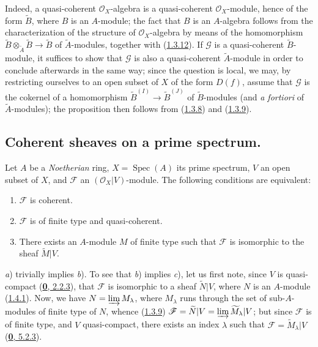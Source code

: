 Indeed, a quasi-coherent $\mathscr{O}_X$-algebra is a quasi-coherent
$\mathscr{O}_X$-module, hence of the form $\widetilde{B}$, where
$B$ is an $A$-module; the fact that $B$ is an $A$-algebra follows from the
characterization of the structure of $\mathscr{O}_X$-algebra by means of
the homomorphism
$\widetilde{B}\otimes_{\widetilde{A}}\widetilde{B}\to\widetilde{B}$ of
$\widetilde{A}$-modules, together with
(\hyperref[I.1.3.12]{1.3.12}). If $\mathscr{G}$ is a quasi-coherent
$\widetilde{B}$-module, it suffices to show that $\mathscr{G}$ is also a
quasi-coherent $\widetilde{A}$-module in order to conclude afterwards in the
same way; since the question is local, we may, by restricting ourselves to
an open subset of $X$ of the form $D(f)$, assume that $\mathscr{G}$ is the
cokernel of a homomorphism
$\widetilde{B}^{(I)}\to\widetilde{B}^{(J)}$ of $\widetilde{B}$-modules (and
\emph{a fortiori} of $\widetilde{A}$-modules); the proposition then follows
from (\hyperref[I.1.3.8]{1.3.8}) and
(\hyperref[I.1.3.9]{1.3.9}).

\subsection{Coherent sheaves on a prime spectrum.}
\label{subsection:I.1.5}

\begin{theorem}[1.5.1]
\label{I.1.5.1}
Let $A$ be a \emph{Noetherian} ring, $X=\operatorname{Spec}(A)$ its prime
spectrum, $V$ an open subset of $X$, and $\mathscr{F}$ an
$(\mathscr{O}_X|V)$-module. The following conditions are equivalent:
\begin{enumerate}
  \item[\textup{a)}] $\mathscr{F}$ is coherent.
  \item[\textup{b)}] $\mathscr{F}$ is of finite type and quasi-coherent.
  \item[\textup{c)}] There exists an $A$-module $M$ of finite type such that
  $\mathscr{F}$ is isomorphic to the sheaf $\widetilde{M}|V$.
\end{enumerate}
\end{theorem}

\textit{a}) trivially implies \textit{b}). To see that \textit{b})
implies \textit{c}), let us first note, since $V$ is quasi-compact
(\hyperref[0.2.2.3]{\textbf{0}, 2.2.3}), that $\mathscr{F}$ is isomorphic to a
sheaf $\widetilde{N}|V$, where $N$ is an $A$-module
(\hyperref[I.1.4.1]{1.4.1}). Now, we have
$N=\varinjlim M_\lambda$, where $M_\lambda$ runs through the set of
sub-$A$-modules of finite type of $N$, whence
(\hyperref[I.1.3.9]{1.3.9})
$\mathscr{F}=\widetilde{N}|V=\varinjlim\widetilde{M}_\lambda|V$; but since
$\mathscr{F}$ is of finite type, and $V$ quasi-compact, there exists an index
$\lambda$ such that $\mathscr{F}=\widetilde{M}_\lambda|V$
(\hyperref[0.5.2.3]{\textbf{0}, 5.2.3}).


